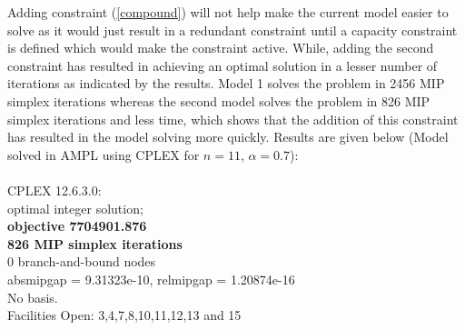 \documentclass[12pt]{article}
\numberwithin{equation}{section}
\begin{document}
Adding constraint (\ref{compound}) will not help make the current model easier to solve as it would just result in a redundant constraint until a capacity constraint is defined which would make the constraint active. While, adding the second constraint has resulted in achieving an optimal solution in a lesser number of iterations as indicated by the results. Model 1 solves the problem in 2456 MIP simplex iterations whereas the second model solves the problem in 826 MIP simplex iterations and less time, which shows that the addition of this constraint has resulted in the model solving more quickly. Results are given below (Model solved in AMPL using CPLEX for $n = 11$, $\alpha = 0.7$):\\
\\CPLEX 12.6.3.0:\\
optimal integer solution; \\
\textbf{objective 7704901.876}\\
\textbf{826 MIP simplex iterations}\\
0 branch-and-bound nodes\\
absmipgap = 9.31323e-10, relmipgap = 1.20874e-16\\
No basis.\\
Facilities Open: 3,4,7,8,10,11,12,13 and 15\\[0.05cm]
\end{document}
